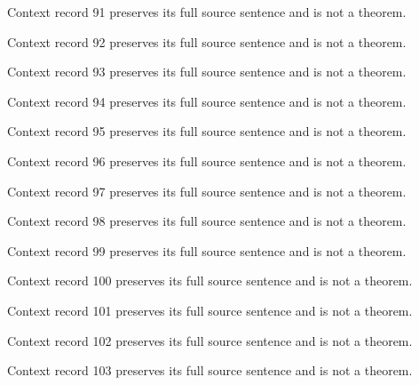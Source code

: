 \documentclass{article}
\begin{document}
\begin{remark}\label{train:context:91}Context record 91 preserves its full source sentence and is not a theorem.\end{remark}
\begin{remark}\label{train:context:92}Context record 92 preserves its full source sentence and is not a theorem.\end{remark}
\begin{remark}\label{train:context:93}Context record 93 preserves its full source sentence and is not a theorem.\end{remark}
\begin{remark}\label{train:context:94}Context record 94 preserves its full source sentence and is not a theorem.\end{remark}
\begin{remark}\label{train:context:95}Context record 95 preserves its full source sentence and is not a theorem.\end{remark}
\begin{remark}\label{train:context:96}Context record 96 preserves its full source sentence and is not a theorem.\end{remark}
\begin{remark}\label{train:context:97}Context record 97 preserves its full source sentence and is not a theorem.\end{remark}
\begin{remark}\label{train:context:98}Context record 98 preserves its full source sentence and is not a theorem.\end{remark}
\begin{remark}\label{train:context:99}Context record 99 preserves its full source sentence and is not a theorem.\end{remark}
\begin{remark}\label{train:context:100}Context record 100 preserves its full source sentence and is not a theorem.\end{remark}
\begin{remark}\label{train:context:101}Context record 101 preserves its full source sentence and is not a theorem.\end{remark}
\begin{remark}\label{train:context:102}Context record 102 preserves its full source sentence and is not a theorem.\end{remark}
\begin{remark}\label{train:context:103}Context record 103 preserves its full source sentence and is not a theorem.\end{remark}
\end{document}
